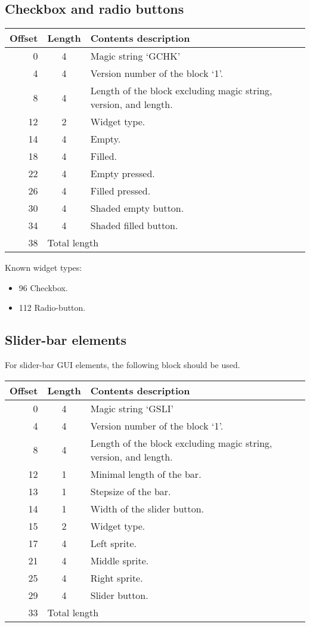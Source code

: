 \documentclass{article}
\begin{document}
\subsection{Checkbox and radio buttons}
\begin{center}
\begin{tabular}{|r|c|l|} \hline
\textbf{Offset} & \textbf{Length} & \textbf{Contents description} \\ \hline
   0 &  4 & Magic string `GCHK' \\
   4 &  4 & Version number of the block `1'. \\
   8 &  4 & Length of the block excluding magic string, version, and length. \\
  12 &  2 & Widget type. \\
  14 &  4 & Empty. \\
  18 &  4 & Filled. \\
  22 &  4 & Empty pressed. \\
  26 &  4 & Filled pressed. \\
  30 &  4 & Shaded empty button. \\
  34 &  4 & Shaded filled button. \\
  38 & \multicolumn{2}{l|}{Total length} \\ \hline
\end{tabular}
\end{center}

Known widget types:
\begin{itemize}
\item 96 Checkbox.
\item 112 Radio-button.
\end{itemize}

\subsection{Slider-bar elements}
For slider-bar GUI elements, the following block
should be used.
\begin{center}
\begin{tabular}{|r|c|l|} \hline
\textbf{Offset} & \textbf{Length} & \textbf{Contents description} \\ \hline
   0 &  4 & Magic string `GSLI' \\
   4 &  4 & Version number of the block `1'. \\
   8 &  4 & Length of the block excluding magic string, version, and length. \\
  12 &  1 & Minimal length of the bar. \\
  13 &  1 & Stepsize of the bar. \\
  14 &  1 & Width of the slider button. \\
  15 &  2 & Widget type. \\
  17 &  4 & Left sprite. \\
  21 &  4 & Middle sprite. \\
  25 &  4 & Right sprite. \\
  29 &  4 & Slider button. \\
  33 & \multicolumn{2}{l|}{Total length} \\ \hline
\end{tabular}
\end{center}
\end{document}
